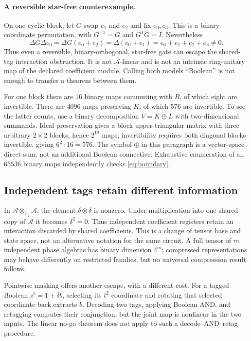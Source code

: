 \documentclass[11pt,a4paper]{article}
\theoremstyle{definition}\newtheorem{definition}[theorem]{Definition}
\theoremstyle{remark}\newtheorem{remark}[theorem]{Remark}
\newcommand{\F}{\mathbb F}
\newcommand{\A}{\mathcal A}
\numberwithin{equation}{section}
\begin{document}
\paragraph{A reversible star-free counterexample.}
On one cyclic block, let $G$ swap $e_1$ and $e_2$ and fix $e_0,e_3$. This is a binary coordinate permutation, with $G^{-1}=G$ and $G^TG=I$. Nevertheless
\begin{equation}\label{eq:witness}
 \Delta G\Delta e_0
 =\Delta G(e_0+e_2)
 =\Delta(e_0+e_1)
 =e_0+e_1+e_2+e_3\ne0.
\end{equation}
Thus even a reversible, binary-orthogonal, star-free gate can escape the shared-tag interaction obstruction. It is not $\A$-linear and is not an intrinsic ring-unitary map of the declared coefficient module. Calling both models ``Boolean'' is not enough to transfer a theorem between them.

For one block there are $16$ binary maps commuting with $R$, of which eight are invertible. There are $4096$ maps preserving $K$, of which $576$ are invertible. To see the latter counts, use a binary decomposition $V=K\mathbin{\oplus}L$ with two-dimensional summands. Ideal preservation gives a block upper-triangular matrix with three arbitrary $2\times2$ blocks, hence $2^{12}$ maps; invertibility requires both diagonal blocks invertible, giving $6^2\cdot16=576$. The symbol $\oplus$ in this paragraph is a vector-space direct sum, not an additional Boolean connective. Exhaustive enumeration of all $65536$ binary maps independently checks \eqref{eq:boundary}.

\subsection{Independent tags retain different information}
In $\A\otimes_{\F_2}\A$, the element $\delta\otimes\delta$ is nonzero. Under multiplication into one shared copy of $\A$ it becomes $\delta^2=0$. Thus independent coefficient registers retain an interaction discarded by shared coefficients. This is a change of tensor base and state space, not an alternative notation for the same circuit. A full tensor of $m$ independent phase algebras has binary dimension $4^m$; compressed representations may behave differently on restricted families, but no universal compression result follows.

Pointwise masking offers another escape, with a different cost. For a tagged Boolean $z^b=1+\delta b$, selecting its $t^2$ coordinate and rotating that selected coordinate back extracts $b$. Decoding two tags, applying Boolean AND, and retagging computes their conjunction, but the joint map is nonlinear in the two inputs. The linear no-go theorem does not apply to such a decode--AND--retag procedure.
\end{document}
